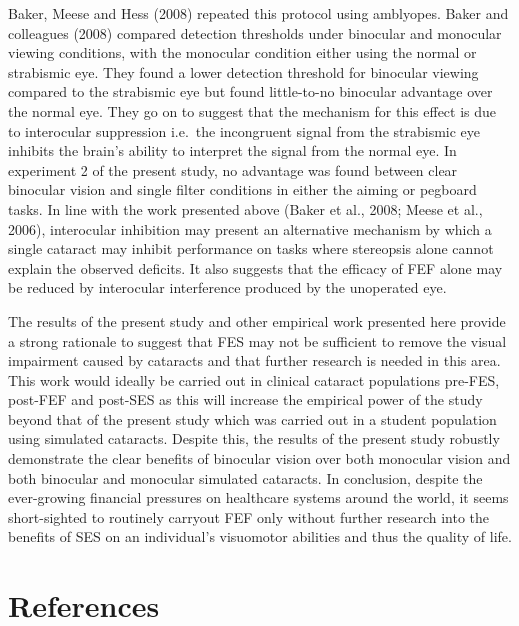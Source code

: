 \documentclass[
  english,
  man,floatsintext]{apa6}
\begin{document}
Baker, Meese and Hess (2008) repeated this protocol using amblyopes.
Baker and colleagues (2008) compared detection thresholds under binocular and monocular viewing conditions, with the monocular condition either using the normal or strabismic eye.
They found a lower detection threshold for binocular viewing compared to the strabismic eye but found little-to-no binocular advantage over the normal eye.
They go on to suggest that the mechanism for this effect is due to interocular suppression i.e.~the incongruent signal from the strabismic eye inhibits the brain's ability to interpret the signal from the normal eye.
In experiment 2 of the present study, no advantage was found between clear binocular vision and single filter conditions in either the aiming or pegboard tasks.
In line with the work presented above (Baker et al., 2008; Meese et al., 2006), interocular inhibition may present an alternative mechanism by which a single cataract may inhibit performance on tasks where stereopsis alone cannot explain the observed deficits.
It also suggests that the efficacy of FEF alone may be reduced by interocular interference produced by the unoperated eye.

The results of the present study and other empirical work presented here provide a strong rationale to suggest that FES may not be sufficient to remove the visual impairment caused by cataracts and that further research is needed in this area.
This work would ideally be carried out in clinical cataract populations pre-FES, post-FEF and post-SES as this will increase the empirical power of the study beyond that of the present study which was carried out in a student population using simulated cataracts.
Despite this, the results of the present study robustly demonstrate the clear benefits of binocular vision over both monocular vision and both binocular and monocular simulated cataracts.
In conclusion, despite the ever-growing financial pressures on healthcare systems around the world, it seems short-sighted to routinely carryout FEF only without further research into the benefits of SES on an individual's visuomotor abilities and thus the quality of life.

\newpage

\hypertarget{references}{%
\section{References}\label{references}}

\begingroup
\setlength{\parindent}{-0.5in}
\setlength{\leftskip}{0.5in}

\hypertarget{refs}{}

\endgroup
\end{document}
